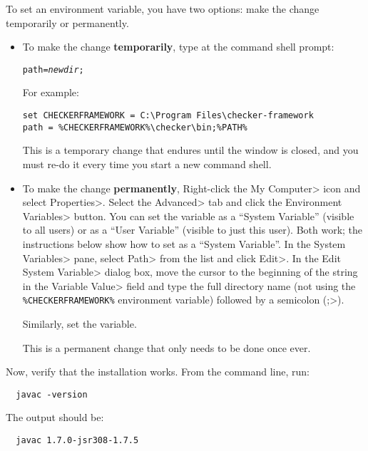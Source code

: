 \begin{enumerate}

To set an environment variable, you have two options:  make the change
temporarily or permanently.
\begin{itemize}
\item
To make the change \textbf{temporarily}, type at the command shell prompt:

\begin{alltt}
path = \emph{newdir};%PATH%
\end{alltt}

For example:

\begin{Verbatim}
set CHECKERFRAMEWORK = C:\Program Files\checker-framework
path = %CHECKERFRAMEWORK%\checker\bin;%PATH%
\end{Verbatim}

This is a temporary change that endures until the window is closed, and you
must re-do it every time you start a new command shell.

\item
To make the change \textbf{permanently},
Right-click the \<My Computer> icon and
select \<Properties>. Select the \<Advanced> tab and click the
\<Environment Variables> button. You can set the variable as a ``System
Variable'' (visible to all users) or as a ``User Variable'' (visible to
just this user).  Both work; the instructions below show how to set as a
``System Variable''.
In the \<System Variables> pane, select
\<Path> from the list and click \<Edit>. In the \<Edit System Variable>
dialog box, move the cursor to the beginning of the string in the
\<Variable Value> field and type the full directory name (not using the
\verb|%CHECKERFRAMEWORK%| environment variable) followed by a
semicolon (\<;>).

Similarly, set the  variable.

This is a permanent change that only needs to be done once ever.
\end{itemize}



Now, verify that the installation works.  From the command line, run:

\begin{Verbatim}
  javac -version
\end{Verbatim}

The output should be:

\begin{Verbatim}
  javac 1.7.0-jsr308-1.7.5
\end{Verbatim}

\end{enumerate}


